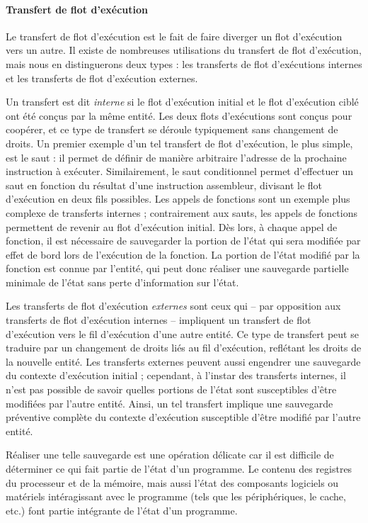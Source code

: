 		\paragraph{Transfert de flot d'exécution}
		\label{sec:transfer_def}

			Le transfert de flot d'exécution est le fait de faire diverger un flot d'exécution vers un autre. Il existe de nombreuses utilisations du transfert de flot d'exécution, mais nous en distinguerons deux types : les transferts de flot d'exécutions internes et les transferts de flot d'exécution externes.

			Un transfert est dit \emph{interne} si le flot d'exécution initial et le flot d'exécution ciblé ont été conçus par la même entité. Les deux flots d'exécutions sont conçus pour coopérer, et ce type de transfert se déroule typiquement sans changement de droits. Un premier exemple d'un tel transfert de flot d'exécution, le plus simple, est le saut : il permet de définir de manière arbitraire l'adresse de la prochaine instruction à exécuter. Similairement, le saut conditionnel permet d'effectuer un saut en fonction du résultat d'une instruction assembleur, divisant le flot d'exécution en deux fils possibles. Les appels de fonctions sont un exemple plus complexe de transferts internes ; contrairement aux sauts, les appels de fonctions permettent de revenir au flot d'exécution initial. Dès lors, à chaque appel de fonction, il est nécessaire de sauvegarder la portion de l'état qui sera modifiée par effet de bord lors de l'exécution de la fonction.  La portion de l'état modifié par la fonction est connue par l'entité, qui peut donc réaliser une sauvegarde partielle minimale de l'état sans perte d'information sur l'état.

			Les transferts de flot d'exécution \emph{externes} sont ceux qui -- par opposition aux transferts de flot d'exécution internes -- impliquent un transfert de flot d'exécution vers le fil d'exécution d'une autre entité. Ce type de transfert peut se traduire par un changement de droits liés au fil d'exécution, reflétant les droits de la nouvelle entité. Les transferts externes peuvent aussi engendrer une sauvegarde du contexte d'exécution initial ; cependant, à l'instar des transferts internes, il n'est pas possible de savoir quelles portions de l'état sont susceptibles d'être modifiées par l'autre entité. Ainsi, un tel transfert implique une sauvegarde préventive complète du contexte d'exécution susceptible d'être modifié par l'autre entité.

			Réaliser une telle sauvegarde est une opération délicate car il est difficile de déterminer ce qui fait partie de l'état d'un programme. Le contenu des registres du processeur et de la mémoire, mais aussi l'état des composants logiciels ou matériels intéragissant avec le programme (tels que les périphériques, le cache, etc.) font partie intégrante de l'état d'un programme. 


